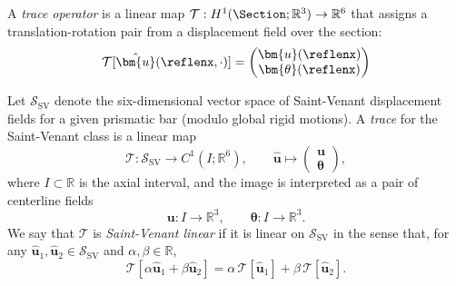 \begin{Quote}
\begin{definition}
A \emph{trace operator} is a linear map 
$\mathcal{T}: H^1(\Section; \mathbb{R}^3) \to \mathbb{R}^6$ 
that assigns a translation-rotation pair from a displacement field over the section:
\begin{equation}
\mathcal{T}[\hat{\bm{u}}(\reflenx, \cdot)] = 
\begin{pmatrix} \bm{u}(\reflenx) \\ \bm{\theta}(\reflenx) \end{pmatrix}
\label{eq:def-trace}
\end{equation}
\end{definition}
\end{Quote}

\begin{definition}[Trace]
Let $\mathcal{S}_{\mathrm{SV}}$ denote the six-dimensional vector space of 
Saint-Venant displacement fields for a given prismatic bar (modulo global rigid 
motions). 
A \emph{trace} for the Saint-Venant class is a linear map
\[
\mathcal{T} : \mathcal{S}_{\mathrm{SV}} \to C^1(I;\mathbb{R}^6),
\qquad
\hat{\bm{u}} \mapsto 
\begin{pmatrix}
\bm{u} \\[2pt] \bm{\theta}
\end{pmatrix},
\]
where $I \subset \mathbb{R}$ is the axial interval, and the image is interpreted 
as a pair of centerline fields
\[
\bm{u} : I \to \mathbb{R}^3,
\qquad
\bm{\theta} : I \to \mathbb{R}^3.
\]
We say that $\mathcal{T}$ is \emph{Saint-Venant linear} if it is linear on 
$\mathcal{S}_{\mathrm{SV}}$ in the sense that, for any 
$\hat{\bm{u}}_1,\hat{\bm{u}}_2 \in \mathcal{S}_{\mathrm{SV}}$ and 
$\alpha,\beta \in \mathbb{R}$,
\[
\mathcal{T}[\alpha \hat{\bm{u}}_1 + \beta \hat{\bm{u}}_2]
=
\alpha\,\mathcal{T}[\hat{\bm{u}}_1] + \beta\,\mathcal{T}[\hat{\bm{u}}_2].
\]
\end{definition}


